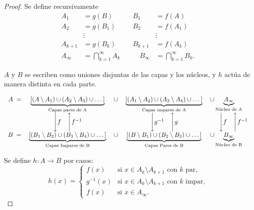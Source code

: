 \documentclass[11pt, a4paper]{article}
\begin{document}
\begin{proof}
Se define recursivamente
\begin{align*}
    A_1 &= g(B) & B_1 &= f(A) \\
    A_2 &= g(B_1) & B_2 &= f(A_1) \\
    &\vdots & &\vdots \\
    A_{k+1} &= g(B_k) & B_{k+1} &= f(A_k) \\
    A_\infty &= \bigcap_{k=1}^{\infty} A_k \quad & \quad B_\infty &= \bigcap_{k=1}^{\infty} B_k.
\end{align*}

$A$ y $B$ se escriben como uniones disjuntas de las capas y los núcleos, y $h$ actúa de
manera distinta en cada parte.

\[
\setlength{\arraycolsep}{6pt}
\begin{array}{rcccl}
    A \; = & 
    \underbrace{\left[ (A \setminus A_1) \cup (A_2 \setminus A_3) \cup \dots \right]}_{\text{Capas
    pares de A}} & 
    \cup & 
    \underbrace{\left[ (A_1 \setminus A_2) \cup (A_3 \setminus A_4) \cup \dots \right]}_{\text{Capas
    impares de A}} & 
    \cup \underbrace{A_\infty}_{\text{Núcleo de A}} \\
    
    & 
    \Bigg\downarrow f \quad \Bigg\uparrow f^{-1} & 
    & 
    \Bigg\downarrow g^{-1} \quad \Bigg\uparrow g &
    
    \hspace{0.5cm} \Bigg\downarrow f \quad \Bigg\uparrow f^{-1} \\
    
    B \; = & 
    \underbrace{\left[ (B_1 \setminus B_2) \cup (B_3 \setminus B_4) \cup \dots \right]}_{\text{Capas
    Impares de B}} & 
    \cup & 
    \underbrace{\left[ (B \setminus B_1) \cup (B_2 \setminus B_3) \cup \dots \right]}_{\text{Capas
    Pares de B}} & 
    \cup \underbrace{B_\infty}_{\text{Núcleo de B}} \\
\end{array}
\]

Se define $h: A \to B$ por casos:
$$
h(x) = \begin{cases}
    f(x) & \text{si } x \in A_k \setminus A_{k+1} \text{ con } k \text{ par,} \\
    g^{-1}(x) & \text{si } x \in A_k \setminus A_{k+1} \text{ con } k \text{ impar,} \\
    f(x) & \text{si } x \in A_\infty.
\end{cases}
$$


\end{proof}
\end{document}
